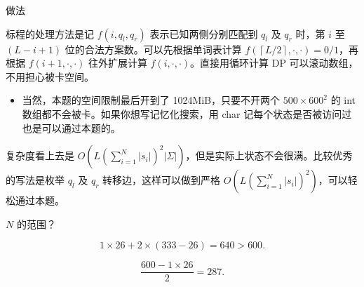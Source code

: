 \documentclass[utf8,usenames,dvipsnames]{beamer}
\begin{document}
\begin{frame}{做法}
	
	标程的处理方法是记 $f\left(i,q_l, q_r\right)$ 表示已知两侧分别匹配到 $q_l$ 及 $q_r$ 时，第 $i$ 至 $(L-i+1)$ 位的合法方案数。可以先根据单词表计算 $f\left(\left\lceil L/2\right\rceil, \cdot, \cdot\right)=0/1$，再根据 $f(i+1,\cdot,\cdot)$ 往外扩展计算 $f(i,\cdot,\cdot)$。直接用循环计算 DP 可以滚动数组，不用担心被卡空间。
	\begin{itemize}
		\item 当然，本题的空间限制最后开到了 1024MiB，只要不开两个 $500\times 600^2$ 的 int 数组都不会被卡。如果你想写记忆化搜索，用 char 记每个状态是否被访问过也是可以通过本题的。
	\end{itemize}

	复杂度看上去是 $O\left(L \left(\sum_{i=1}^N \left|s_i\right|\right)^2 |\Sigma|\right)$，但是实际上状态不会很满。比较优秀的写法是枚举 $q_l$ 及 $q_r$ 转移边，这样可以做到严格 $O\left(L \left(\sum_{i=1}^N \left|s_i\right|\right)^2\right)$，可以轻松通过本题。

\end{frame}

\begin{frame}{$N$ 的范围？}
	
	$$1\times 26 + 2 \times (333 - 26) = 640 > 600.$$

	$$\frac{600-1\times 26}{2} = 287.$$

\end{frame}
\end{document}
